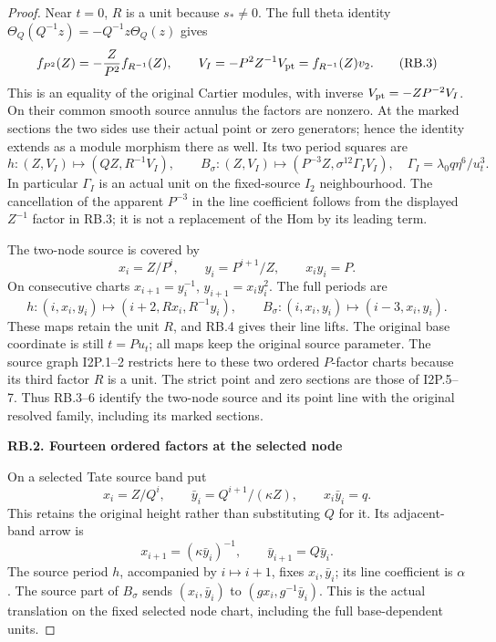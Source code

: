 \begin{proof}
Near \(t=0\), \(R\) is a unit because \(s_*\ne0\). The full
theta identity \(\Theta_Q(Q^{-1}z)=-Q^{-1}z\Theta_Q(z)\) gives
\[
 f_{P^2}(Z)=-\frac{Z}{P^2}f_{R^{-1}}(Z),\qquad
 V_I=-P^2Z^{-1}V_{\rm pt}=f_{R^{-1}}(Z)v_2.
 \tag{RB.3}
\]
This is an equality of the original Cartier modules, with inverse
\(V_{\rm pt}=-ZP^{-2}V_I\). On their common smooth source annulus
the factors are nonzero. At the marked sections the two sides use
their actual point or zero generators; hence the identity extends
as a module morphism there as well. Its two period squares are
\[
 h:(Z,V_I)\longmapsto(QZ,R^{-1}V_I),\qquad
 B_\sigma:(Z,V_I)\longmapsto
       (P^{-3}Z,\sigma^{12}\Gamma_I V_I),
 \quad \Gamma_I=\lambda_0q\eta^6/u_t^3.
 \tag{RB.4}
\]
In particular \(\Gamma_I\) is an actual unit on the fixed-source
\(I_2\) neighbourhood. The cancellation of the apparent \(P^{-3}\)
in the line coefficient follows from the displayed \(Z^{-1}\)
factor in RB.3; it is not a replacement of the Hom by its leading term.

The two-node source is covered by
\[
 x_i=Z/P^i,\qquad y_i=P^{i+1}/Z,\qquad x_i y_i=P.
 \tag{RB.5}
\]
On consecutive charts \(x_{i+1}=y_i^{-1}\),
\(y_{i+1}=x_i y_i^2\). The full periods are
\[
 h:(i,x_i,y_i)\longmapsto(i+2,Rx_i,R^{-1}y_i),\qquad
 B_\sigma:(i,x_i,y_i)\longmapsto(i-3,x_i,y_i).
 \tag{RB.6}
\]
These maps retain the unit \(R\), and RB.4 gives their line lifts.
The original base coordinate is still \(t=Pu_t\); all maps keep
the original source parameter. The source graph I2P.1--2 restricts
here to these two ordered \(P\)-factor charts because its third
factor \(R\) is a unit. The strict point and zero sections are those
of I2P.5--7. Thus RB.3--6 identify the two-node source and its point
line with the original resolved family, including its marked sections.

\par

\medskip\noindent\textbf{RB.2. Fourteen ordered factors at the selected node}

\par\nobreak

On a selected Tate source band put
\[
 x_i=Z/Q^i,\qquad \bar y_i=Q^{i+1}/(\kappa Z),
                  \qquad x_i\bar y_i=q.
 \tag{RB.7}
\]
This retains the original height rather than substituting \(Q\)
for it. Its adjacent-band arrow is
\[
 x_{i+1}=(\kappa\bar y_i)^{-1},\qquad
 \bar y_{i+1}=Q\bar y_i.
 \tag{RB.8}
\]
The source period \(h\), accompanied by \(i\mapsto i+1\), fixes
\(x_i,\bar y_i\); its line coefficient is \(\alpha\). The source
part of \(B_\sigma\) sends \((x_i,\bar y_i)\) to
\((gx_i,g^{-1}\bar y_i)\). This is the actual translation on the
fixed selected node chart, including the full base-dependent units.


\end{proof}
